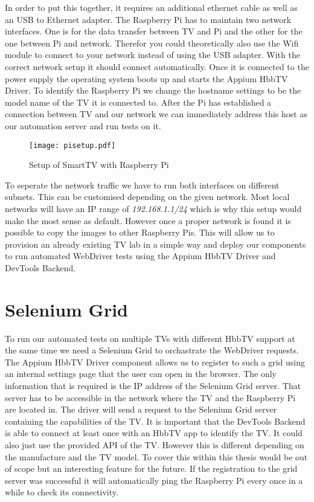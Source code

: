 In order to put this together, it requires an additional ethernet cable as well as an USB to Ethernet
adapter. The Raspberry Pi has to maintain two network interfaces. One is for the data transfer between
TV and Pi and the other for the one between Pi and network. Therefor you could theoretically also use
the Wifi module to connect to your network instead of using the USB adapter. With the correct network
setup it should connect automatically. Once it is connected to the power supply the operating system
boots up and starts the Appium HbbTV Driver. To identify the Raspberry Pi we change the hostname
settings to be the model name of the TV it is connected to. After the Pi has established a connection
between TV and our network we can immediately address this host as our automation server and run tests
on it.

\vspace{1cm}
\begin{figure}[htb]
  \centering
  \texttt{[image: pisetup.pdf]}\\
  \caption{Setup of SmartTV with Raspberry Pi}\label{fig:pisetup}
\end{figure}
\vspace{0.5cm}

To seperate the network traffic we have to run both interfaces on different subnets. This can be
customised depending on the given network. Most local networks will have an IP range of
\textit{192.168.1.1/24} which is why this setup would make the most sense as default. However
once a proper network is found it is possible to copy the images to other Raspberry Pis. This will
allow us to provision an already existing TV lab in a simple way and deploy our components to run
automated WebDriver tests using the Appium HbbTV Driver and DevTools Backend.

\section{Selenium Grid\label{sec:grid}}

To run our automated tests on multiple TVs with different HbbTV support at the same time we need
a Selenium Grid to orchastrate the WebDriver requests. The Appium HbbTV Driver component allows us
to register to such a grid using an internal settings page that the user can open in the browser.
The only information that is required is the IP address of the Selenium Grid server. That server
has to be accessible in the network where the TV and the Raspberry Pi are located in. The driver
will send a request to the Selenium Grid server containing the capabilities of the TV. It is
important that the DevTools Backend is able to connect at least once with an HbbTV app to identify
the TV. It could also just use the provided API of the TV. However this is different depending on
the manufacture and the TV model. To cover this within this thesis would be out of scope but an
interesting feature for the future. If the registration to the grid server was successful it will
automatically ping the Raspberry Pi every once in a while to check its connectivity.

